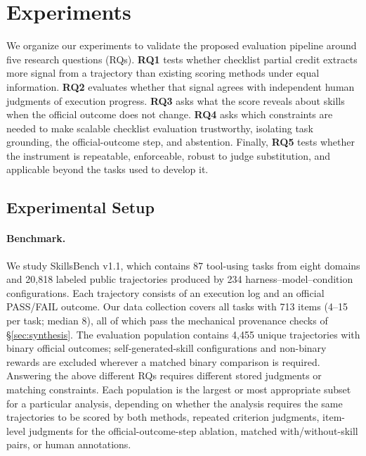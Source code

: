 \documentclass[sigconf,nonacm]{acmart}
\begin{document}
\section{Experiments}
\label{sec:experiments}

We organize our experiments to validate the proposed evaluation pipeline around five research questions (RQs). \textbf{RQ1} tests whether checklist
partial credit extracts more signal from a trajectory than existing scoring
methods under equal information. \textbf{RQ2} evaluates whether that signal
agrees with independent human judgments of execution progress. \textbf{RQ3}
asks what the score reveals about skills when the official outcome does not
change. \textbf{RQ4} asks which constraints are needed to make scalable
checklist evaluation trustworthy, isolating task grounding, the
official-outcome step, and abstention. Finally, \textbf{RQ5} tests whether the
instrument is repeatable, enforceable, robust to judge substitution, and
applicable beyond the tasks used to develop it.

\subsection{Experimental Setup}
\label{sec:setup}

\paragraph{Benchmark.}
We study SkillsBench v1.1, which contains 87 tool-using tasks from eight domains
and 20{,}818 labeled public trajectories produced by 234
harness--model--condition configurations. Each trajectory consists of an
execution log and an official PASS/FAIL outcome. Our
data collection covers all tasks with 713 items (4--15 per
task; median 8), all of which pass the mechanical provenance checks of
\S\ref{sec:synthesis}. The evaluation population contains 4{,}455 unique
trajectories with binary official outcomes; self-generated-skill
configurations and non-binary rewards are excluded wherever a matched binary
comparison is required. Answering the above different RQs requires different stored judgments or matching
constraints. Each population is the largest or most appropriate subset for a particular analysis, depending on whether the analysis requires the same trajectories to be scored by both methods, repeated criterion judgments, item-level judgments for the official-outcome-step ablation, matched with/without-skill pairs, or human annotations.
\end{document}
